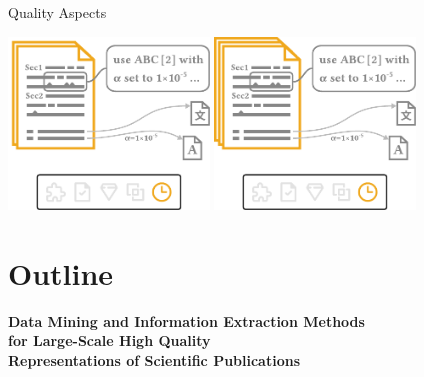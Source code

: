 \documentclass[en,16:9,smallfoot]{sdqbeamer}
\begin{document}
\begin{frame}{Quality Aspects}
\begin{overprint}
            \centering\includegraphics[width=0.4\textwidth]{imgs/schema_asp_4_1}
            \centering\includegraphics[width=0.4\textwidth]{imgs/schema_asp_4_2}
       \end{overprint}
   \end{frame}




\section{Outline}

   \begin{frame}[plain]
        \vspace{1cm}
        \centering
        \begin{Large}
        \textbf{Data Mining and Information Extraction Methods}\\
        \vspace{0.25em}
        {\color{lightgrey}\textbf{for Large-Scale High Quality}}\\
        \vspace{0.5em}
        {\color{lightgrey}\textbf{Representations of Scientific Publications}}
        \end{Large}
   \end{frame}
\end{document}
